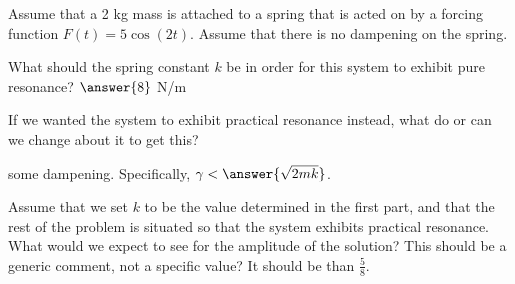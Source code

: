 \documentclass{ximera}
\begin{document}
\begin{exercise}
    Assume that a 2 kg mass is attached to a spring that is acted on by a forcing function $F(t) = 5 \cos(2t)$. Assume that there is no dampening on the spring.
    
    What should the spring constant $k$ be in order for this system to exhibit pure resonance? $\answer{8}$ N/m
    \begin{problem}
        If we wanted the system to exhibit practical resonance instead, what do or can we change about it to get this?
        
         some dampening. Specifically, $\gamma < \answer{\sqrt{2mk}}$.
        \begin{problem}
            Assume that we set $k$ to be the value determined in the first part, and that the rest of the problem is situated so that the system exhibits practical resonance. What would we expect to see for the amplitude of the solution? This should be a generic comment, not a specific value? It should be  than $\frac{5}{8}$.
        \end{problem}
    \end{problem}
\end{exercise}
\end{document}
